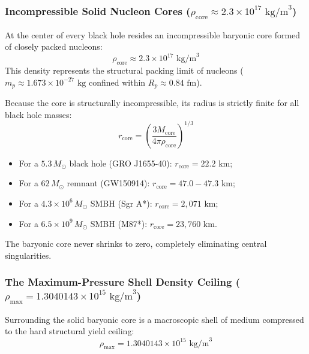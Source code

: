 \documentclass[11pt,a4paper]{article}
\begin{document}
\subsubsection{Incompressible Solid Nucleon Cores ($\rho_{\text{core}} \approx 2.3 \times 10^{17}\text{ kg/m}^3$)}
\label{subsubsec:solid_core}

At the center of every black hole resides an incompressible baryonic core formed of closely packed nucleons:
\begin{equation}
\rho_{\text{core}} \approx 2.3 \times 10^{17}\text{ kg/m}^3
\label{eq:rho_core_def}
\end{equation}
This density represents the structural packing limit of nucleons ($m_p \approx 1.673 \times 10^{-27}\text{ kg}$ confined within $R_p \approx 0.84\text{ fm}$). 

Because the core is structurally incompressible, its radius is strictly finite for all black hole masses:
\begin{equation}
r_{\text{core}} = \left( \frac{3 M_{\text{core}}}{4\pi \rho_{\text{core}}} \right)^{1/3}
\label{eq:r_core_formula}
\end{equation}

\begin{itemize}
    \item For a $5.3\,M_\odot$ black hole (GRO J1655-40): $r_{\text{core}} = 22.2\text{ km}$;
    \item For a $62\,M_\odot$ remnant (GW150914): $r_{\text{core}} = 47.0 - 47.3\text{ km}$;
    \item For a $4.3 \times 10^6\,M_\odot$ SMBH (Sgr A*): $r_{\text{core}} = 2,071\text{ km}$;
    \item For a $6.5 \times 10^9\,M_\odot$ SMBH (M87*): $r_{\text{core}} = 23,760\text{ km}$.
\end{itemize}

The baryonic core never shrinks to zero, completely eliminating central singularities.

\subsubsection{The Maximum-Pressure Shell Density Ceiling ($\rho_{\max} = 1.3040143 \times 10^{15}\text{ kg/m}^3$)}
\label{subsubsec:rho_max_ceiling}

Surrounding the solid baryonic core is a macroscopic shell of medium compressed to the hard structural yield ceiling:
\begin{equation}
\rho_{\max} = 1.3040143 \times 10^{15}\text{ kg/m}^3
\label{eq:rho_max_val}
\end{equation}
\end{document}
